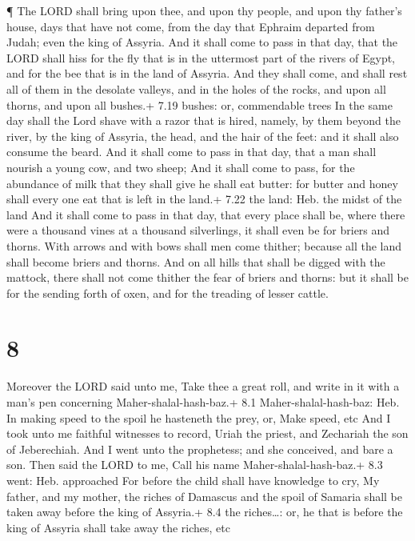  ¶ The LORD shall bring upon thee, and upon thy people, and
upon thy father's house, days that have not come, from the day that
Ephraim departed from Judah; even the king of Assyria.  And
it shall come to pass in that day, that the LORD shall hiss for the fly
that is in the uttermost part of the rivers of Egypt, and for the bee
that is in the land of Assyria.  And they shall come, and
shall rest all of them in the desolate valleys, and in the holes of the
rocks, and upon all thorns, and upon all bushes.+ 7.19 bushes: or,
commendable trees  In the same day shall the Lord shave
with a razor that is hired, namely, by them beyond the river, by the
king of Assyria, the head, and the hair of the feet: and it shall also
consume the beard.  And it shall come to pass in that day,
that a man shall nourish a young cow, and two sheep;  And
it shall come to pass, for the abundance of milk that they shall give he
shall eat butter: for butter and honey shall every one eat that is left
in the land.+ 7.22 the land: Heb. the midst of the land 
And it shall come to pass in that day, that every place shall be, where
there were a thousand vines at a thousand silverlings, it shall even be
for briers and thorns.  With arrows and with bows shall men
come thither; because all the land shall become briers and thorns.
 And on all hills that shall be digged with the mattock,
there shall not come thither the fear of briers and thorns: but it shall
be for the sending forth of oxen, and for the treading of lesser cattle.

\hypertarget{section-7}{%
\section{8}\label{section-7}}

 Moreover the LORD said unto me, Take thee a great roll, and
write in it with a man's pen concerning Maher-shalal-hash-baz.+ 8.1
Maher-shalal-hash-baz: Heb. In making speed to the spoil he hasteneth
the prey, or, Make speed, etc  And I took unto me faithful
witnesses to record, Uriah the priest, and Zechariah the son of
Jeberechiah.  And I went unto the prophetess; and she
conceived, and bare a son. Then said the LORD to me, Call his name
Maher-shalal-hash-baz.+ 8.3 went: Heb. approached  For
before the child shall have knowledge to cry, My father, and my mother,
the riches of Damascus and the spoil of Samaria shall be taken away
before the king of Assyria.+ 8.4 the riches\ldots: or, he that is before
the king of Assyria shall take away the riches, etc

